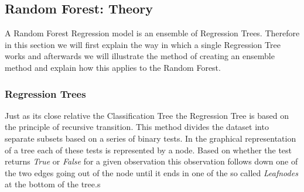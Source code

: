 \subsection{Random Forest: Theory}
A Random Forest Regression model is an ensemble of Regression Trees. Therefore in this section we will first explain the way in which a single Regression Tree works and afterwards we will illustrate the method of creating an ensemble method and explain how this applies to the Random Forest.
\subsubsection{Regression Trees}
Just as its close relative the Classification Tree the Regression Tree is based on the principle of recursive transition. This method divides the dataset into separate subsets based on a series of binary tests. In the graphical representation of a tree each of these tests is represented by a node. Based on whether the test returns \textit{True} or \textit{False} for a given observation this observation follows down one of the two edges going out of the node until it ends in one of the so called \textit{Leafnodes} at the bottom of the tree.s